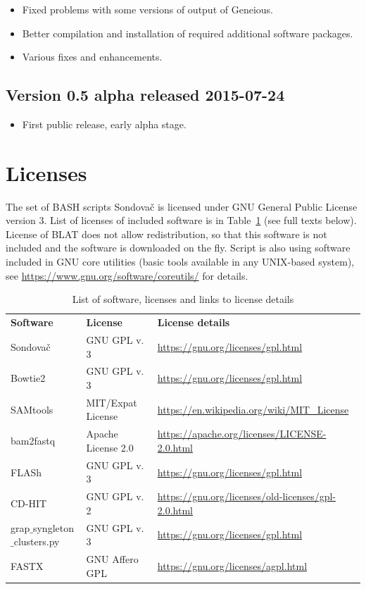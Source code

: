 \documentclass[a4paper, 11pt, twoside]{article}
\begin{document}
\begin{itemize}
  \item Fixed problems with some versions of output of Geneious.
  \item Better compilation and installation of required additional software packages.
  \item Various fixes and enhancements.
\end{itemize}

\subsection{Version 0.5 alpha released 2015-07-24}

\begin{itemize}
  \item First public release, early alpha stage.
\end{itemize}

\section{Licenses}

The set of BASH scripts Sondovač is licensed under GNU General Public License version 3. List of licenses of included software is in Table~\ref{software-lic} (see full texts below). License of BLAT does not allow redistribution, so that this software is not included and the software is downloaded on the fly. Script is also using software included in GNU core utilities (basic tools available in any UNIX-based system), see \url{https://www.gnu.org/software/coreutils/} for details.

\begin{longtable}{| >{\centering\arraybackslash}m{2.5cm} >{\centering\arraybackslash}m{3.4cm} >{\centering\arraybackslash}m{8.8cm} |}
\caption[List of software and licenses]{List of software, licenses and links to license details}\\
\hline
\endhead
\hline
\endfoot
\textbf{Software} & \textbf{License} & \textbf{License details}\\
Sondovač & GNU GPL v. 3 & \url{https://gnu.org/licenses/gpl.html}\\
Bowtie2 & GNU GPL v. 3 & \url{https://gnu.org/licenses/gpl.html}\\
SAMtools & MIT/Expat License & \url{https://en.wikipedia.org/wiki/MIT_License}\\
bam2fastq & Apache License 2.0 & \url{https://apache.org/licenses/LICENSE-2.0.html}\\ %
FLASh & GNU GPL v. 3 & \url{https://gnu.org/licenses/gpl.html}\\
CD-HIT & GNU GPL v. 2 & \url{https://gnu.org/licenses/old-licenses/gpl-2.0.html}\\
grap$\_$synglet\-on$\_$clusters.py & GNU GPL v. 3 & \url{https://gnu.org/licenses/gpl.html}\\
FASTX & GNU Affero GPL & \url{https://gnu.org/licenses/agpl.html}
\label{software-lic}
\end{longtable}
\end{document}
